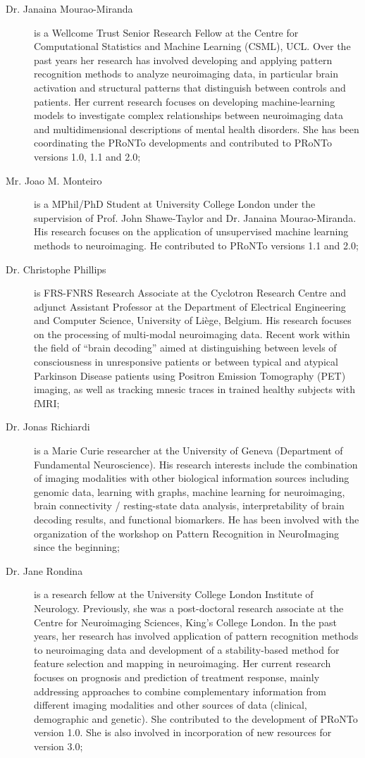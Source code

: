 \begin{description}
	\item[Dr. Janaina Mourao-Miranda] is a Wellcome Trust Senior Research Fellow at the Centre for Computational Statistics and Machine Learning (CSML), UCL.  Over the past years her research has involved developing and applying pattern recognition methods to analyze neuroimaging data, in particular brain activation and structural patterns that distinguish between controls and patients. Her current research focuses on developing machine-learning models to investigate complex relationships between neuroimaging data and multidimensional descriptions of mental health disorders. She has been coordinating the PRoNTo developments and contributed to PRoNTo versions 1.0, 1.1 and 2.0;
	\item[Mr. Joao M. Monteiro] is a MPhil/PhD Student at University College London under the supervision of Prof. John Shawe-Taylor and Dr. Janaina Mourao-Miranda. His research focuses on the application of unsupervised machine learning methods to neuroimaging. He contributed to PRoNTo versions 1.1 and 2.0;
	\item[Dr. Christophe Phillips] is FRS-FNRS Research Associate at the Cyclotron Research Centre and adjunct Assistant Professor at the Department of Electrical Engineering and Computer Science, University of Li\`ege, Belgium. His research focuses on the processing of multi-modal neuroimaging data. Recent work within the field of ``brain decoding'' aimed at distinguishing between levels of consciousness in unresponsive patients or between typical and atypical Parkinson Disease patients using Positron Emission Tomography (PET) imaging, as well as tracking mnesic traces in trained healthy subjects with fMRI;
	\item[Dr. Jonas Richiardi] is a Marie Curie researcher at the University of Geneva (Department of Fundamental Neuroscience). His research interests include the combination of imaging modalities with other biological information sources including genomic data, learning with graphs, machine learning for neuroimaging, brain connectivity / resting-state data analysis, interpretability of brain decoding results, and functional biomarkers. He has been involved with the organization of the workshop on Pattern Recognition in NeuroImaging since the beginning;
	\item[Dr. Jane Rondina] is a research fellow at the University College London Institute of Neurology. Previously, she was a post-doctoral research associate at the Centre for Neuroimaging Sciences, King's College London. In the past years, her research has involved application of pattern recognition methods to neuroimaging data and development of a stability-based method for feature selection and mapping in neuroimaging. Her current research focuses on prognosis and prediction of treatment response, mainly addressing approaches to combine complementary information from different imaging modalities and other sources of data (clinical, demographic and genetic). She contributed to the development of PRoNTo version 1.0. She is also involved in incorporation of new resources for version 3.0;

\end{description}

